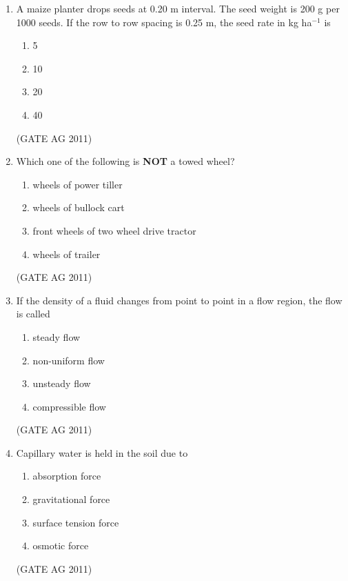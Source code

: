 \documentclass[journal,12pt,onecolumn]{IEEEtran}
\theoremstyle{remark}
\begin{document}
\begin{enumerate}
\item A maize planter drops seeds at 0.20 m interval. The seed weight is 200 g per 1000 seeds.  
If the row to row spacing is 0.25 m, the seed rate in kg ha$^{-1}$ is
\begin{multicols}{4}
\begin{enumerate}
\item 5
\item 10
\item 20
\item 40
\end{enumerate}
\end{multicols}
\hfill{(GATE AG 2011)}

\item Which one of the following is \textbf{NOT} a towed wheel?
\begin{multicols}{4}
\begin{enumerate}
\item wheels of power tiller
\item wheels of bullock cart
\item front wheels of two wheel drive tractor
\item wheels of trailer
\end{enumerate}
\end{multicols}
\hfill{(GATE AG 2011)}

\item If the density of a fluid changes from point to point in a flow region, the flow is called
\begin{multicols}{4}
\begin{enumerate}
\item steady flow
\item non-uniform flow
\item unsteady flow
\item compressible flow
\end{enumerate}
\end{multicols}
\hfill{(GATE AG 2011)}

\item Capillary water is held in the soil due to
\begin{multicols}{4}
\begin{enumerate}
\item absorption force
\item gravitational force
\item surface tension force
\item osmotic force
\end{enumerate}
\end{multicols}
\hfill{(GATE AG 2011)}


\end{enumerate}
\end{document}
